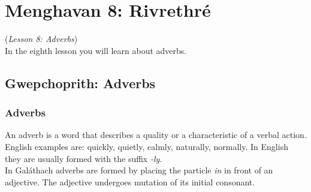 \section{Menghavan 8: Rivrethr\'{e}}
(\textit{Lesson 8: Adverbs})\\

In the eighth lesson you will learn about adverbs.

\subsection{Gwepchoprith: Adverbs}
\subsubsection{Adverbs}

An adverb is a word that describes a quality or a characteristic of a verbal action.\\
English examples are: quickly, quietly, calmly, naturally, normally. In English they are usually formed with the suffix \textit{-ly}.\\
In Gal\'{a}thach adverbs are formed by placing the particle \textit{in} in front of an adjective. The adjective undergoes mutation of its initial consonant.
